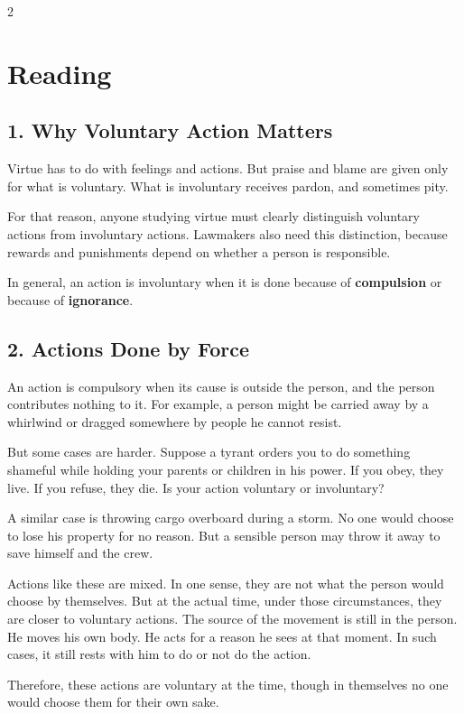 \documentclass[12pt]{article}
\begin{document}
\begin{multicols}{2}
\section*{Reading}

\subsection*{1. Why Voluntary Action Matters}
Virtue has to do with feelings and actions. But praise and blame are given only for what is voluntary. What is involuntary receives pardon, and sometimes pity.

For that reason, anyone studying virtue must clearly distinguish voluntary actions from involuntary actions. Lawmakers also need this distinction, because rewards and punishments depend on whether a person is responsible.

In general, an action is involuntary when it is done because of \textbf{compulsion} or because of \textbf{ignorance}.

\subsection*{2. Actions Done by Force}
An action is compulsory when its cause is outside the person, and the person contributes nothing to it. For example, a person might be carried away by a whirlwind or dragged somewhere by people he cannot resist.

But some cases are harder. Suppose a tyrant orders you to do something shameful while holding your parents or children in his power. If you obey, they live. If you refuse, they die. Is your action voluntary or involuntary?

A similar case is throwing cargo overboard during a storm. No one would choose to lose his property for no reason. But a sensible person may throw it away to save himself and the crew.

Actions like these are mixed. In one sense, they are not what the person would choose by themselves. But at the actual time, under those circumstances, they are closer to voluntary actions. The source of the movement is still in the person. He moves his own body. He acts for a reason he sees at that moment. In such cases, it still rests with him to do or not do the action.

Therefore, these actions are voluntary at the time, though in themselves no one would choose them for their own sake.


\end{multicols}
\end{document}
